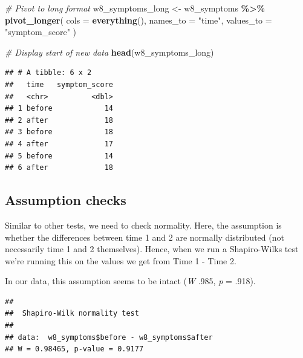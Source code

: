\documentclass[
]{book}
\newenvironment{Shaded}{\begin{snugshade}}{\end{snugshade}}
\newcommand{\AttributeTok}[1]{\textcolor[rgb]{0.13,0.29,0.53}{#1}}
\newcommand{\CommentTok}[1]{\textcolor[rgb]{0.56,0.35,0.01}{\textit{#1}}}
\newcommand{\FunctionTok}[1]{\textcolor[rgb]{0.13,0.29,0.53}{\textbf{#1}}}
\newcommand{\NormalTok}[1]{#1}
\newcommand{\OtherTok}[1]{\textcolor[rgb]{0.56,0.35,0.01}{#1}}
\newcommand{\SpecialCharTok}[1]{\textcolor[rgb]{0.81,0.36,0.00}{\textbf{#1}}}
\newcommand{\StringTok}[1]{\textcolor[rgb]{0.31,0.60,0.02}{#1}}
\begin{document}
\begin{Shaded}
\begin{Highlighting}[]
\CommentTok{\# Pivot to long format}
\NormalTok{w8\_symptoms\_long }\OtherTok{\textless{}{-}}\NormalTok{ w8\_symptoms }\SpecialCharTok{\%\textgreater{}\%}
  \FunctionTok{pivot\_longer}\NormalTok{(}
    \AttributeTok{cols =} \FunctionTok{everything}\NormalTok{(),}
    \AttributeTok{names\_to =} \StringTok{"time"}\NormalTok{,}
    \AttributeTok{values\_to =} \StringTok{"symptom\_score"}
\NormalTok{  )}

\CommentTok{\# Display start of new data}
\FunctionTok{head}\NormalTok{(w8\_symptoms\_long)}
\end{Highlighting}
\end{Shaded}

\begin{verbatim}
## # A tibble: 6 x 2
##   time   symptom_score
##   <chr>          <dbl>
## 1 before            14
## 2 after             18
## 3 before            18
## 4 after             17
## 5 before            14
## 6 after             18
\end{verbatim}

\hypertarget{assumption-checks-2}{%
\subsection{Assumption checks}\label{assumption-checks-2}}

Similar to other tests, we need to check normality. Here, the assumption is whether the differences between time 1 and 2 are normally distributed (not necessarily time 1 and 2 themselves). Hence, when we run a Shapiro-Wilks test we're running this on the values we get from Time 1 - Time 2.

In our data, this assumption seems to be intact (\emph{W} .985, \emph{p} = .918).

\begin{Shaded}
\end{Shaded}

\begin{verbatim}
## 
##  Shapiro-Wilk normality test
## 
## data:  w8_symptoms$before - w8_symptoms$after
## W = 0.98465, p-value = 0.9177
\end{verbatim}
\end{document}

